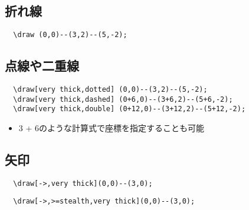 \documentclass[16pt,b5paper]{article}
\begin{document}
\subsection{折れ線}


\begin{lstlisting}
  \draw (0,0)--(3,2)--(5,-2);
\end{lstlisting}

\subsection{点線や二重線}


\begin{lstlisting}
  \draw[very thick,dotted] (0,0)--(3,2)--(5,-2);
  \draw[very thick,dashed] (0+6,0)--(3+6,2)--(5+6,-2);
  \draw[very thick,double] (0+12,0)--(3+12,2)--(5+12,-2);
\end{lstlisting}

\begin{itemize}
  \item 3 + 6のような計算式で座標を指定することも可能
\end{itemize}

\subsection{矢印}


\begin{lstlisting}
  \draw[->,very thick](0,0)--(3,0);
\end{lstlisting}


\begin{lstlisting}
  \draw[->,>=stealth,very thick](0,0)--(3,0);
\end{lstlisting}
\end{document}
